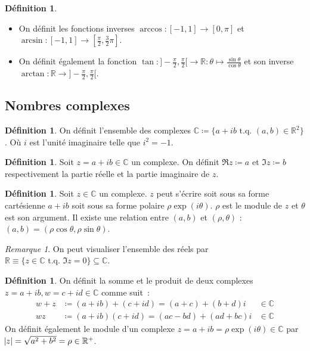 \documentclass{article}
\newcommand{\R}{\mathbb R}
\newcommand{\C}{\mathbb C}
\renewcommand{\interval}[2]{\left[#1, #2\right]}
\newcommand{\tq}{\textrm{ t.q. }}
\theoremstyle{definition}
\newtheorem{déf}[thm]{Définition}
\theoremstyle{remark}
\newtheorem*{rmq}{Remarque}
\begin{document}
		\begin{déf}~
		\begin{itemize}
			\item On définit les fonctions inverses $\arccos : \interval {-1}1 \to \interval 0\pi$ et $\arcsin : \interval {-1}1 \to \interval {\frac \pi2}{\frac 32\pi}$.
			\item On définit également la fonction $\tan : ]-\frac \pi2, \frac \pi2[ \to \R : \theta \mapsto \frac {\sin\theta}{\cos\theta}$ et son inverse
			      $\arctan : \R \to ]-\frac \pi2, \frac \pi2[$.
		\end{itemize}
		\end{déf}

	\subsection{Nombres complexes}
		\begin{déf} On définit l'ensemble des complexes $\C \coloneqq \{a + ib \tq (a, b) \in \R^2\}$. Où $i$ est l'unité imaginaire telle que $i^2 = -1$. \end{déf}

		\begin{déf} Soit $z = a + ib \in \C$ un complexe. On définit $\Re z \coloneqq a$ et $\Im z \coloneqq b$ respectivement la partie réelle et la partie
		imaginaire de $z$. \end{déf}

		\begin{déf} Soit $z \in \C$ un complexe. $z$ peut s'écrire soit sous sa forme cartésienne $a + ib$ soit sous sa forme polaire $\rho \exp(i\theta)$. $\rho$
		est le module de $z$ et $\theta$ est son argument. Il existe une relation entre $(a, b)$ et $(\rho, \theta)$ : $(a, b) = (\rho\cos\theta, \rho\sin\theta)$.
		\end{déf}

		\begin{rmq} On peut visualiser l'ensemble des réels par $\R \equiv \{z \in \C \tq \Im z = 0\} \subseteq \C$. \end{rmq}

		\begin{déf} On définit la somme et le produit de deux complexes $z = a+ib, w = c + id \in \C$ comme suit~:
		\begin{align*}
			w+z &\coloneqq (a+ib) + (c+id) = (a+c) + (b+d)i &\in \C \\
			w z &\coloneqq (a+ib)(c+id) = (ac - bd) + (ad+bc)i &\in \C
		\end{align*}
		On définit également le module d'un complexe $z = a+ib = \rho\exp(i\theta) \in \C$ par $\abs z = \sqrt {a^2+b^2} = \rho \in \R^+$. \end{déf}
\end{document}
